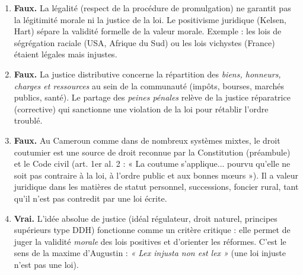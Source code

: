\documentclass[11pt]{article}
\newcommand{\cle}[1]{{\popxbold\color{popdark}#1}}
\begin{document}
\begin{corrige}
\begin{enumerate}
\item \textbf{Faux.} La \cle{légalité} (respect de la procédure de promulgation) ne garantit pas la \cle{légitimité} morale ni la \cle{justice} de la loi. Le positivisme juridique (Kelsen, Hart) sépare la validité formelle de la valeur morale. Exemple : les lois de ségrégation raciale (USA, Afrique du Sud) ou les lois vichystes (France) étaient légales mais injustes.
\item \textbf{Faux.} La \cle{justice distributive} concerne la répartition des \emph{biens, honneurs, charges et ressources} au sein de la communauté (impôts, bourses, marchés publics, santé). Le partage des \emph{peines pénales} relève de la \cle{justice réparatrice (corrective)} qui sanctionne une violation de la loi pour rétablir l'ordre troublé.
\item \textbf{Faux.} Au Cameroun comme dans de nombreux systèmes mixtes, le \cle{droit coutumier} est une source de droit reconnue par la Constitution (préambule) et le Code civil (art. 1er al. 2 : « La coutume s'applique... pourvu qu'elle ne soit pas contraire à la loi, à l'ordre public et aux bonnes mœurs »). Il a valeur juridique dans les matières de statut personnel, successions, foncier rural, tant qu'il n'est pas contredit par une loi écrite.
\item \textbf{Vrai.} L'\cle{idée absolue de justice} (idéal régulateur, droit naturel, principes supérieurs type DDH) fonctionne comme un \cle{critère critique} : elle permet de juger la validité \emph{morale} des lois positives et d'orienter les réformes. C'est le sens de la maxime d'Augustin : \emph{« Lex injusta non est lex »} (une loi injuste n'est pas une loi).
\end{enumerate}
\end{corrige}
\end{document}
